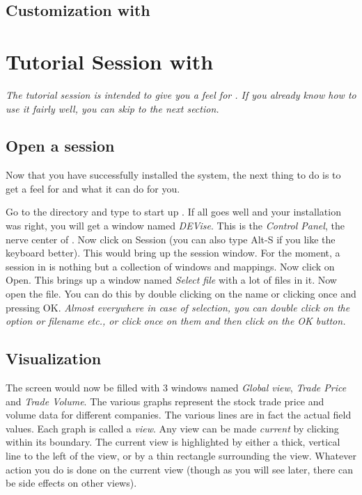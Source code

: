 \subsection{Customization with }

\section{Tutorial Session with \Devise}

{\em The tutorial session is intended to give you a feel for
\Devise. If you already know how to use it fairly well, you can skip
to the next section.}


\subsection{Open a session}
	
Now that you have successfully installed the system, the next thing
to do is to get a feel for \Devise and what it can do for you.

Go to the  directory and type  to start
up \Devise. If all goes well and your installation was right, you will
get a window named {\em DEVise}. This is the {\em Control Panel}, the
nerve center of \Devise. Now click on Session (you can also type Alt-S
if you like the keyboard better). This would bring up the session
window. For the moment, a session in \Devise is nothing but a
collection of windows and mappings. Now click on Open. This brings up
a window named {\em Select file} with a lot of  files in
it. Now open the  file. You can do this by double
clicking on the  name or clicking once and pressing
OK. {\em Almost everywhere in case of selection, you can double click
on the option or filename etc., or click once on them and then click
on the OK button.}

\subsection{Visualization}


The screen would now be filled with 3 windows named {\em Global view},
{\em Trade Price} and {\em Trade Volume}. The various graphs represent
the stock trade price and volume data for different companies. The
various lines are in fact the actual field values. Each graph is
called a {\em view}. Any view can be made {\em current} by clicking
within its boundary. The current view is highlighted by either a
thick, vertical line to the left of the view, or by a thin rectangle
surrounding the view. Whatever action you do is done on the current
view (though as you will see later, there can be side effects on other
views).

